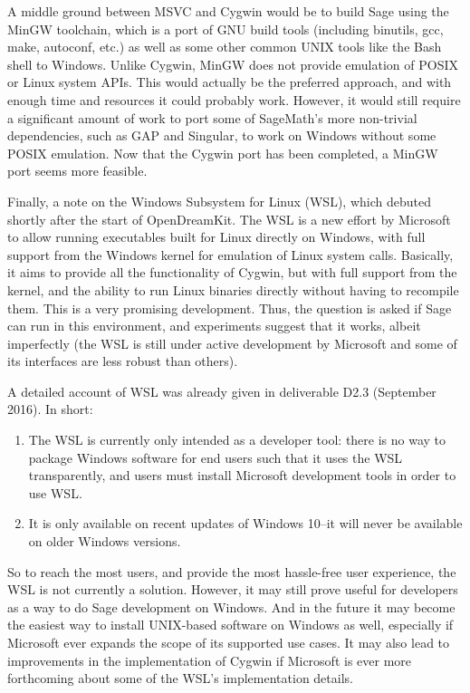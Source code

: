 A middle ground between MSVC and Cygwin would be to build Sage using the
MinGW toolchain, which is a port of GNU build tools (including binutils,
gcc, make, autoconf, etc.) as well as some other common UNIX tools like
the Bash shell to Windows. Unlike Cygwin, MinGW does not provide
emulation of POSIX or Linux system APIs. This would actually be the
preferred approach, and with enough time and resources it could probably
work. However, it would still require a significant amount of work to
port some of SageMath's more non-trivial dependencies, such as GAP and
Singular, to work on Windows without some POSIX emulation. Now that the
Cygwin port has been completed, a MinGW port seems more feasible.

Finally, a note on the Windows Subsystem for Linux (WSL), which debuted shortly
after the start of OpenDreamKit. The WSL is a new effort by Microsoft to allow
running executables built for Linux directly on Windows, with full support from
the Windows kernel for emulation of Linux system calls. Basically, it aims to
provide all the functionality of Cygwin, but with full support from the kernel,
and the ability to run Linux binaries directly without having to recompile
them. This is a very promising development. Thus, the question is asked if Sage
can run in this environment, and experiments suggest that it works, albeit
imperfectly (the WSL is still under active development by Microsoft and some of
its interfaces are less robust than others).

A detailed account of WSL was already given in deliverable D2.3
(September 2016). In short:
\begin{enumerate}
\def\labelenumi{\arabic{enumi})}
\item The WSL is currently only intended as a developer tool: there is no way
    to package Windows software for end users such that it uses the WSL
    transparently, and users must install Microsoft development tools in order
    to use WSL.

\item It is only available on recent updates of Windows 10--it will never be
    available on older Windows versions.
\end{enumerate}

So to reach the most users, and provide the most hassle-free user experience,
the WSL is not currently a solution.  However, it may still prove useful for
developers as a way to do Sage development on Windows. And in the future it may
become the easiest way to install UNIX-based software on Windows as well,
especially if Microsoft ever expands the scope of its supported use cases. It
may also lead to improvements in the implementation of Cygwin if Microsoft is
ever more forthcoming about some of the WSL's implementation details.


